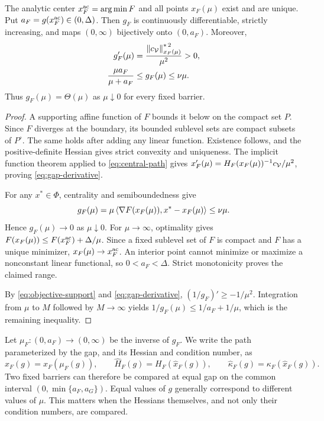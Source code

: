 \begin{proposition}
\label{prop:gap-parametrization}
The analytic center $x_F^{\rm ac}=\operatorname*{arg\,min} F$ and all points
$x_F(\mu)$ exist and are unique. Put $a_F=g(x_F^{\rm ac})\in(0,\Delta)$.
Then $g_F$ is continuously differentiable, strictly increasing, and maps
$(0,\infty)$ bijectively onto $(0,a_F)$. Moreover,
\begin{align}
 g_F'(\mu)&=\frac{\left\lVert c_{\mathcal V}\right\rVert_{x_F(\mu)}^{*\,2}}{\mu^2}>0,
 \label{eq:gap-derivative}\\
 \frac{\mu a_F}{\mu+a_F}&\leq g_F(\mu)\leq\nu\mu.
 \label{eq:gap-mu-comparison}
\end{align}
Thus $g_F(\mu)=\Theta(\mu)$ as $\mu\downarrow0$ for every fixed barrier.
\end{proposition}

\begin{proof}
A supporting affine function of $F$ bounds it below on the compact set
$P$. Since $F$ diverges at the boundary, its bounded sublevel sets are
compact subsets of $P^\circ$. The same holds after adding any linear function. Existence
follows, and the positive-definite Hessian gives strict convexity and
uniqueness. The implicit function theorem applied to
\eqref{eq:central-path} gives
$x_F'(\mu)=H_F(x_F(\mu))^{-1}c_{\mathcal V}/\mu^2$, proving
\eqref{eq:gap-derivative}.

For any $x^*\in\Phi$, centrality and semiboundedness give
\[
 g_F(\mu)=\mu\left\langle \nabla F(x_F(\mu)),x^*-x_F(\mu)\right\rangle
 \leq\nu\mu.
\]
Hence $g_F(\mu)\to0$ as $\mu\downarrow0$. For $\mu\to\infty$,
optimality gives $F(x_F(\mu))\leq F(x_F^{\rm ac})+\Delta/\mu$.
Since a fixed sublevel set of $F$ is compact and $F$ has a unique
minimizer, $x_F(\mu)\to x_F^{\rm ac}$. An interior point cannot minimize or
maximize a nonconstant linear functional, so $0<a_F<\Delta$.
Strict monotonicity proves the claimed range.

By \eqref{eq:objective-support} and \eqref{eq:gap-derivative},
$(1/g_F)'\geq-1/\mu^2$. Integration from $\mu$ to $M$ followed by
$M\to\infty$ yields
$1/g_F(\mu)\leq1/a_F+1/\mu$, which is the remaining inequality.
\end{proof}

Let $\mu_F:(0,a_F)\to(0,\infty)$ be the inverse of $g_F$.
We write the path parameterized by the gap, and its Hessian and
condition number, as
\begin{equation}
 \widehat x_F(g)=x_F(\mu_F(g)),\qquad
 \widehat H_F(g)=H_F(\widehat x_F(g)),\qquad
 \widehat\kappa_F(g)=\kappa_F(\widehat x_F(g)).
 \label{eq:gap-path-notation}
\end{equation}
Two fixed barriers can therefore be compared at equal gap on the common
interval $(0,\min\{a_F,a_G\})$. Equal values of $g$ generally correspond
to different values of $\mu$. This matters when the Hessians themselves,
and not only their condition numbers, are compared.
